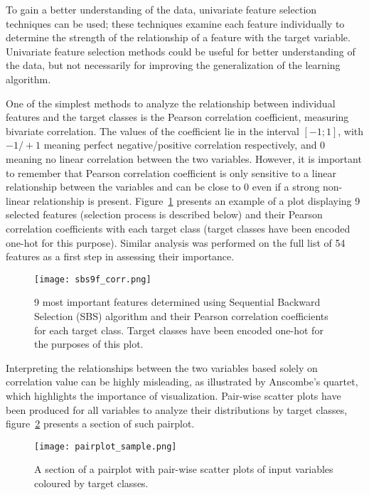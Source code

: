 To gain a better understanding of the data, univariate feature selection techniques can be used;
these techniques examine each feature individually to determine the strength of the relationship of a feature with the target variable.
Univariate feature selection methods could be useful for better understanding of the data, but not necessarily for improving the generalization of the learning algorithm.

One of the simplest methods to analyze the relationship between individual features and the target classes is the Pearson correlation coefficient, measuring bivariate correlation.
The values of the coefficient lie in the interval $[-1; 1]$, with $-1/+1$ meaning perfect negative/positive correlation respectively, and 0 meaning no linear correlation between the two variables.
However, it is important to remember that Pearson correlation coefficient is only sensitive to a linear relationship between the variables and can be close to 0 even if a strong non-linear relationship is present.
Figure~\ref{fig:sbs9f_corr} presents an example of a plot displaying 9 selected features (selection process is described below) and their Pearson correlation coefficients with each target class (target classes have been encoded one-hot for this purpose).
Similar analysis was performed on the full list of 54 features as a first step in assessing their importance.

\begin{figure}[hbt!]
    \centering
    \texttt{[image: sbs9f\_corr.png]}
    \caption{9 most important features determined using Sequential Backward Selection (SBS) algorithm and their Pearson correlation coefficients for each target class.
    Target classes have been encoded one-hot for the purposes of this plot.}
    \label{fig:sbs9f_corr}
\end{figure}

Interpreting the relationships between the two variables based solely on correlation value can be highly misleading, as illustrated by Anscombe's quartet\cite{Anscombe1973}, which highlights the importance of visualization.
Pair-wise scatter plots have been produced for all variables to analyze their distributions by target classes, figure~\ref{fig:pairplot_sample} presents a section of such pairplot.

\begin{figure}[hbt!]
    \centering
    \texttt{[image: pairplot\_sample.png]}
    \caption{A section of a pairplot with pair-wise scatter plots of input variables coloured by target classes.}
    \label{fig:pairplot_sample}
\end{figure}

